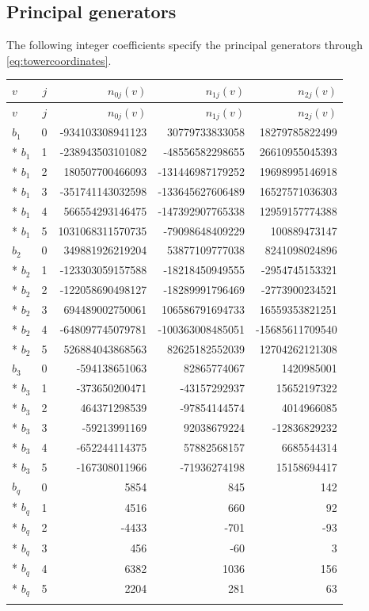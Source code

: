 \documentclass[11pt]{article}
\theoremstyle{remark}\newtheorem{remark}[theorem]{Remark}
\begin{document}
\subsection{Principal generators}
The following integer coefficients specify the principal generators through \eqref{eq:towercoordinates}.
{\small\setlength{\tabcolsep}{7pt}
\begin{longtable}{@{}lrrrr@{}}
\toprule
$v$&$j$&$n_{0j}(v)$&$n_{1j}(v)$&$n_{2j}(v)$\\\midrule
\endfirsthead
\toprule
$v$&$j$&$n_{0j}(v)$&$n_{1j}(v)$&$n_{2j}(v)$\\\midrule
\endhead
$b_1$&0&-934103308941123&30779733833058&18279785822499\\*
$b_1$&1&-238943503101082&-48556582298655&26610955045393\\*
$b_1$&2&180507700466093&-131446987179252&19698995146918\\*
$b_1$&3&-351741143032598&-133645627606489&16527571036303\\*
$b_1$&4&566554293146475&-147392907765338&12959157774388\\*
$b_1$&5&1031068311570735&-79098648409229&100889473147\\
\addlinespace[3pt]
$b_2$&0&349881926219204&53877109777038&8241098024896\\*
$b_2$&1&-123303059157588&-18218450949555&-2954745153321\\*
$b_2$&2&-122058690498127&-18289991796469&-2773900234521\\*
$b_2$&3&694489002750061&106586791694733&16559353821251\\*
$b_2$&4&-648097745079781&-100363008485051&-15685611709540\\*
$b_2$&5&526884043868563&82625182552039&12704262121308\\
\addlinespace[3pt]
$b_3$&0&-594138651063&82865774067&1420985001\\*
$b_3$&1&-373650200471&-43157292937&15652197322\\*
$b_3$&2&464371298539&-97854144574&4014966085\\*
$b_3$&3&-59213991169&92038679224&-12836829232\\*
$b_3$&4&-652244114375&57882568157&6685544314\\*
$b_3$&5&-167308011966&-71936274198&15158694417\\
\addlinespace[3pt]
$b_q$&0&5854&845&142\\*
$b_q$&1&4516&660&92\\*
$b_q$&2&-4433&-701&-93\\*
$b_q$&3&456&-60&3\\*
$b_q$&4&6382&1036&156\\*
$b_q$&5&2204&281&63\\
\addlinespace[3pt]
\bottomrule
\end{longtable}}
\end{document}

